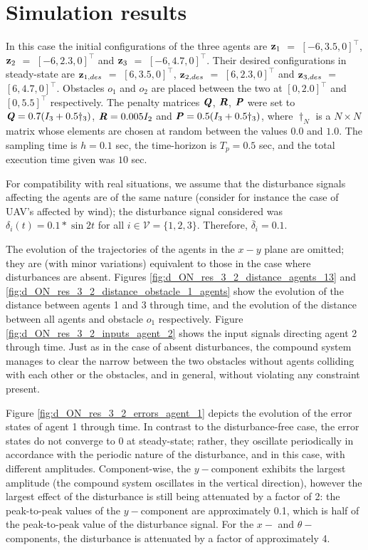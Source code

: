 \section{Simulation results}

In this case the initial configurations of the three agents are
$\bm{\mathbf{z}}_1$ $=$ $[-6, 3.5, 0]^{\top}$,
$\bm{\mathbf{z}}_2$ $=$ $[-6, 2.3, 0]^{\top}$ and
$\bm{\mathbf{z}}_3$ $=$ $[-6, 4.7, 0]^{\top}$.
Their desired configurations in steady-state are
$\bm{\mathbf{z}}_{1,des}$ $=$ $[6, 3.5, 0]^{\top}$,
$\bm{\mathbf{z}}_{2,des}$ $=$ $[6, 2.3, 0]^{\top}$ and
$\bm{\mathbf{z}}_{3,des}$ $=$ $[6, 4.7, 0]^{\top}$.
Obstacles $o_1$ and $o_2$ are placed between the two at $[0, 2.0]^{\top}$
and $[0, 5.5]^{\top}$ respectively. The penalty
matrices $\bm{\mathit{Q}}$, $\bm{\mathit{R}}$, $\bm{\mathit{P}}$ were set to
$\bm{\mathit{Q}} = 0.7 (I_3 + 0.5\dagger_3)$, $\bm{\mathit{R}} = 0.005 I_2$ and
$\bm{\mathit{P}} = 0.5 (I_3 + 0.5\dagger_3)$, where $\dagger_N$ is a $N \times N$
matrix whose elements are chosen at random between the values $0.0$ and $1.0$.
The sampling time is $h = 0.1$ sec, the time-horizon is $T_p = 0.5$ sec, and
the total execution time given was $10$ sec.

For compatibility with real situations, we assume that the disturbance signals
affecting the agents are of the same nature (consider for instance the case
of UAV's affected by wind); the disturbance signal considered was
$\delta_i(t) = 0.1 * \sin 2t$ for all $i \in \mathcal{V} = \{1,2,3\}$.
Therefore, $\overline{\delta}_i = 0.1$.

The evolution of the trajectories of the agents in the
$x-y$ plane are omitted; they are (with minor variations) equivalent to those
in the case where disturbances are absent. Figures
\eqref{fig:d_ON_res_3_2_distance_agents_13} and
\eqref{fig:d_ON_res_3_2_distance_obstacle_1_agents} show the evolution of the
distance between agents 1 and 3 through time, and the evolution of the
distance between all agents and obstacle $o_1$ respectively.
Figure \eqref{fig:d_ON_res_3_2_inputs_agent_2} shows the input signals
directing agent 2 through time. Just as in the case of absent disturbances,
the compound system manages to clear the narrow between the two obstacles without
agents colliding with each other or the obstacles, and in general, without
violating any constraint present.

Figure \eqref{fig:d_ON_res_3_2_errors_agent_1} depicts the evolution of the
error states of agent 1 through time. In contrast to the disturbance-free
case, the error states do not converge to 0 at steady-state; rather, they
oscillate periodically in accordance with the periodic nature of the disturbance,
and in this case, with different amplitudes. Component-wise,
the $y-$component exhibits the largest amplitude (the compound system oscillates
in the vertical direction), however the largest effect of the disturbance
is still being attenuated by a factor of 2: the peak-to-peak values of the
$y-$component are approximately 0.1, which is half of the peak-to-peak value
of the disturbance signal. For the $x-$ and $\theta-$components, the
disturbance is attenuated by a factor of approximately 4.


